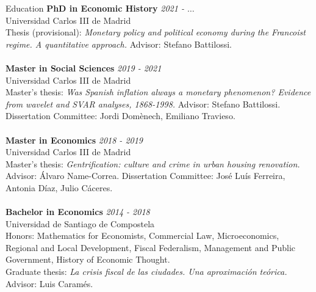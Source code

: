 \documentclass{resume} %
\begin{document}

\vspace{0em}

\begin{rSection}{Education}
	{\bf PhD in Economic History} \hfill {\em 2021 -  $\dots$} 
	\\ Universidad Carlos III de Madrid
	\\ Thesis (provisional): \textit{Monetary policy and political economy during the Francoist regime. A quantitative approach.} Advisor: Stefano Battilossi.
	\\
	\\{\bf Master in Social Sciences} \hfill {\em 2019 - 2021} 
	\\ Universidad Carlos III de Madrid %
	\\ Master's thesis: \textit{Was Spanish inflation always a monetary phenomenon? Evidence from wavelet and SVAR analyses, 1868-1998.} Advisor: Stefano Battilossi. Dissertation Committee: Jordi Domènech, Emiliano Travieso. \\
	\\{\bf Master in Economics} \hfill {\em 2018 - 2019} 
	\\ Universidad Carlos III de Madrid %
	\\ Master's thesis: \textit{Gentrification: culture and crime in urban housing renovation.} Advisor: Álvaro Name-Correa. Dissertation Committee: José Luís Ferreira, Antonia Díaz, Julio Cáceres.
	\\
	\\{\bf Bachelor in Economics} \hfill {\em 2014 - 2018} 
	\\ Universidad de Santiago de Compostela %
	\\ Honors: Mathematics for Economists, Commercial Law, Microeconomics, Regional and Local Development, Fiscal Federalism, Management and Public Government, History of Economic Thought.
	\\ Graduate thesis: \textit{La crisis fiscal de las ciudades. Una aproximación teórica.} Advisor: Luis Caramés.
\end{rSection}
\end{document}
